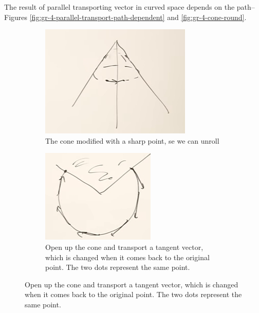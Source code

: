 \documentclass[]{article}
\begin{document}
{The result of parallel transporting vector in curved space depends on the path--Figures \ref{fig:gr-4-parallel-transport-path-dependent} and \ref{fig:gr-4-cone-round}. 

\begin{figure}[H]
	\begin{center}
		\caption{In general the tangent vector to a curve is not covariantly constant}
		\begin{subfigure}[t]{0.3\textwidth}
			\caption{The cone modified with a sharp point, se we can unroll}\label{fig:gr-4-cone}
			\includegraphics[width=\textwidth]{gr-4-cone}
		\end{subfigure}
		\;
		\begin{subfigure}[t]{0.3\textwidth}
			\caption{Open up the cone and transport a tangent vector, which is changed when it comes back to the original point. The two dots represent the same point.}\label{fig:gr-4-cone-sliced-tangent}
			\includegraphics[width=\textwidth]{gr-4-cone-sliced-tangent}

\end{subfigure}
\end{center}
\end{figure}}
\end{document}
